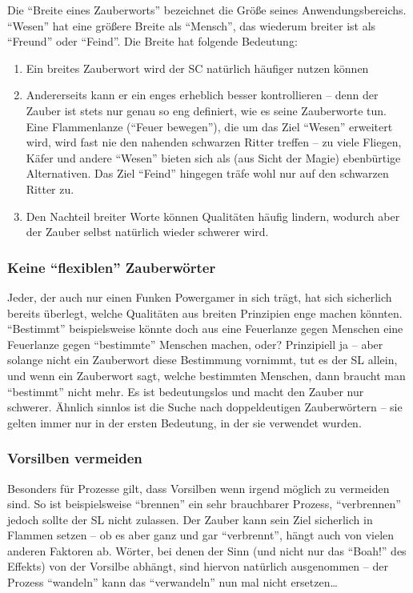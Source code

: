 Die "`Breite eines Zauberworts"' bezeichnet die Größe seines Anwendungsbereichs. "`Wesen"' hat eine größere Breite als "`Mensch"', das wiederum breiter ist als "`Freund"' oder "`Feind"'. Die Breite hat folgende Bedeutung:
\begin{enumerate}
\item Ein breites Zauberwort wird der SC natürlich häufiger nutzen können
\item Andererseits kann er ein enges erheblich besser kontrollieren -- denn der Zauber ist stets nur genau so eng definiert, wie es seine Zauberworte tun. Eine Flammenlanze ("`Feuer bewegen"'), die um das Ziel "`Wesen"' erweitert wird, wird fast nie den nahenden schwarzen Ritter treffen -- zu viele Fliegen, Käfer und andere "`Wesen"' bieten sich als (aus Sicht der Magie) ebenbürtige Alternativen. Das Ziel "`Feind"' hingegen träfe wohl nur auf den schwarzen Ritter zu.
\item Den Nachteil breiter Worte können Qualitäten häufig lindern, wodurch aber der Zauber selbst natürlich wieder schwerer wird.
\end{enumerate}
 
\subsubsection{Keine "`flexiblen"' Zauberwörter}

Jeder, der auch nur einen Funken Powergamer in sich trägt, hat sich sicherlich bereits überlegt, welche Qualitäten aus breiten Prinzipien enge machen könnten. "`Bestimmt"' beispielsweise könnte doch aus eine Feuerlanze gegen Menschen eine Feuerlanze gegen "`bestimmte"' Menschen machen, oder?
Prinzipiell ja -- aber solange nicht ein Zauberwort diese Bestimmung vornimmt, tut es der SL allein, und wenn ein Zauberwort sagt, welche bestimmten Menschen, dann braucht man "`bestimmt"' nicht mehr. Es ist bedeutungslos und macht den Zauber nur schwerer.
Ähnlich sinnlos ist die Suche nach doppeldeutigen Zauberwörtern -- sie gelten immer nur in der ersten Bedeutung, in der sie verwendet wurden.

\subsubsection{Vorsilben vermeiden}

Besonders für Prozesse gilt, dass Vorsilben wenn irgend möglich zu vermeiden sind. So ist beispielsweise "`brennen"' ein sehr brauchbarer Prozess, "`verbrennen"' jedoch sollte der SL nicht zulassen. Der Zauber kann sein Ziel sicherlich in Flammen setzen -- ob es aber ganz und gar "`verbrennt"', hängt auch von vielen anderen Faktoren ab.
Wörter, bei denen der Sinn (und nicht nur das "`Boah!"' des Effekts) von der Vorsilbe abhängt, sind hiervon natürlich ausgenommen -- der Prozess "`wandeln"' kann das "`verwandeln"' nun mal nicht ersetzen\dots

